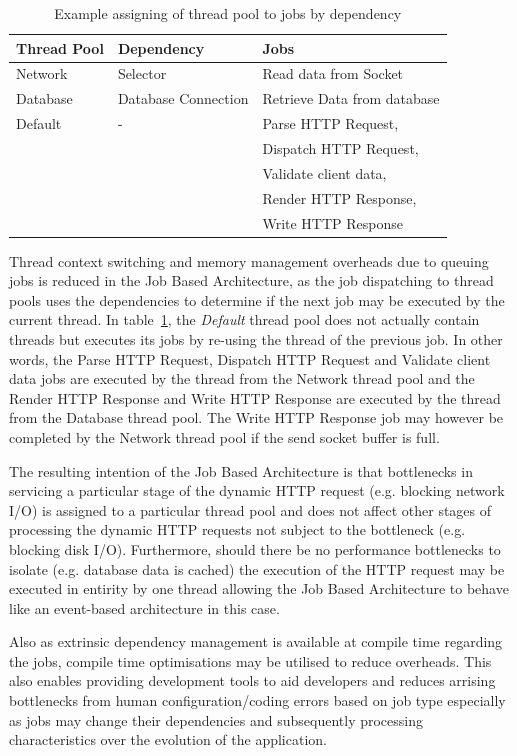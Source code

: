 \documentclass[conference]{ieee/IEEEtran}
\begin{document}
\begin{table}[!t]
\renewcommand{\arraystretch}{1.3}
\caption{Example assigning of thread pool to jobs by dependency}
\label{tab:example_request_thread_pools}
\centering
\begin{tabular}{l||l||l}
\hline
\bfseries Thread Pool & \bfseries Dependency & \bfseries Jobs \\
\hline
\hline
Network & Selector & Read data from Socket \\
\hline
Database & Database Connection & Retrieve Data from database \\
\hline
Default & - & Parse HTTP Request, \\
& & Dispatch HTTP Request, \\
& & Validate client data, \\ 
& & Render HTTP Response, \\
& & Write HTTP Response \\
\hline
\end{tabular}
\end{table}

Thread context switching and memory management overheads due to queuing jobs is
reduced in the Job Based Architecture, as the job dispatching to thread pools
uses the dependencies to determine if the next job may be executed by the
current thread.  In table~\ref{tab:example_request_thread_pools}, the
\textit{Default} thread pool does not actually contain threads but executes its
jobs by re-using the thread of the previous job.  In other words, the Parse HTTP
Request, Dispatch HTTP Request and Validate client data jobs are executed by the
thread from the Network thread pool and the Render HTTP Response and Write HTTP
Response are executed by the thread from the Database thread pool.  The Write
HTTP Response job may however be completed by the Network thread pool if the
send socket buffer is full.

The resulting intention of the Job Based Architecture is that bottlenecks in
servicing a particular stage of the dynamic HTTP request (e.g. blocking network
I/O) is assigned to a particular thread pool and does not affect other stages of
processing the dynamic HTTP requests not subject to the bottleneck (e.g.
blocking disk I/O). Furthermore, should there be no performance bottlenecks to
isolate (e.g. database data is cached) the execution of the HTTP request may be
executed in entirity by one thread allowing the Job Based Architecture to behave
like an event-based architecture in this case.

Also as extrinsic dependency management is available at compile time regarding
the jobs, compile time optimisations may be utilised to reduce overheads.  This
also enables providing development tools to aid developers and reduces arrising
bottlenecks from human configuration/coding errors based on job type especially
as jobs may change their dependencies and subsequently processing
characteristics over the evolution of the application.
\end{document}
